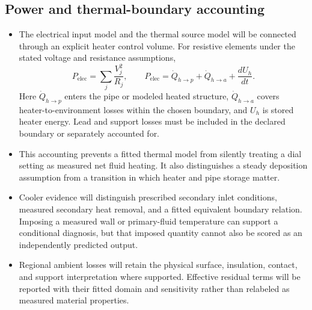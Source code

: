 \subsection{Power and thermal-boundary accounting}\label{subsec:power-and-boundary-accounting}
\begin{itemize}[leftmargin=*]
\item The electrical input model and the thermal source model will be connected through an explicit heater control volume. For resistive elements under the stated voltage and resistance assumptions,
\begin{equation}
P_{\mathrm{elec}}=\sum_j\frac{V_j^2}{R_j},\qquad
P_{\mathrm{elec}}=\dot Q_{h\to p}+\dot Q_{h\to a}+\frac{dU_h}{dt}.
\label{eq:heater-accounting}
\end{equation}
Here $\dot Q_{h\to p}$ enters the pipe or modeled heated structure, $\dot Q_{h\to a}$ covers heater-to-environment losses within the chosen boundary, and $U_h$ is stored heater energy. Lead and support losses must be included in the declared boundary or separately accounted for.
\item This accounting prevents a fitted thermal model from silently treating a dial setting as measured net fluid heating. It also distinguishes a steady deposition assumption from a transition in which heater and pipe storage matter.
\item Cooler evidence will distinguish prescribed secondary inlet conditions, measured secondary heat removal, and a fitted equivalent boundary relation. Imposing a measured wall or primary-fluid temperature can support a conditional diagnosis, but that imposed quantity cannot also be scored as an independently predicted output.
\item Regional ambient losses will retain the physical surface, insulation, contact, and support interpretation where supported. Effective residual terms will be reported with their fitted domain and sensitivity rather than relabeled as measured material properties.\cite{jcgm2020measurementmodels}
\end{itemize}
